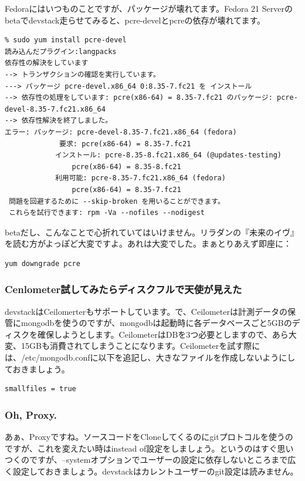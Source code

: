 \documentclass[9pt,b5paper,tombo,openany]{jsbook}
\begin{document}
Fedoraにはいつものことですが、パッケージが壊れてます。Fedora 21 Serverのbetaでdevstack走らせてみると、pcre-develとpcreの依存が壊れてます。

\begin{lstlisting}
% sudo yum install pcre-devel
読み込んだプラグイン:langpacks
依存性の解決をしています
--> トランザクションの確認を実行しています。
---> パッケージ pcre-devel.x86_64 0:8.35-7.fc21 を インストール
--> 依存性の処理をしています: pcre(x86-64) = 8.35-7.fc21 のパッケージ: pcre-devel-8.35-7.fc21.x86_64
--> 依存性解決を終了しました。
エラー: パッケージ: pcre-devel-8.35-7.fc21.x86_64 (fedora)
             要求: pcre(x86-64) = 8.35-7.fc21
            インストール: pcre-8.35-8.fc21.x86_64 (@updates-testing)
                pcre(x86-64) = 8.35-8.fc21
            利用可能: pcre-8.35-7.fc21.x86_64 (fedora)
                pcre(x86-64) = 8.35-7.fc21
 問題を回避するために --skip-broken を用いることができます。
 これらを試行できます: rpm -Va --nofiles --nodigest
\end{lstlisting}

betaだし、こんなことで心折れていてはいけません。リラダンの『未来のイヴ』を読む方がよっぽど大変ですよ。あれは大変でした。まぁとりあえず即座に：

\begin{lstlisting}
yum downgrade pcre
\end{lstlisting}

\subsubsection{Cenlometer試してみたらディスクフルで天使が見えた}

devstackはCeilomerterもサポートしています。で、Ceilometerは計測データの保管にmongodbを使うのですが、mongodbは起動時に各データベースごと5GBのディスクを確保しようとします。CeilometerはDBを3つ必要としますので、あら大変、15GBも消費されてしまうことになります。Ceilometerを試す際には、/etc/mongodb.confに以下を追記し、大きなファイルを作成しないようにしておきましょう。

\begin{lstlisting}
smallfiles = true
\end{lstlisting}

\subsubsection{Oh, Proxy.}

あぁ、Proxyですね。ソースコードをCloneしてくるのにgitプロトコルを使うのですが、これを変えたい時はinstead of設定をしましょう。というのはすぐ思いつくのですが、--systemオプションでユーザーの設定に依存しないところまで広く設定しておきましょう。devstackはカレントユーザーのgit設定は読みません。
\end{document}
